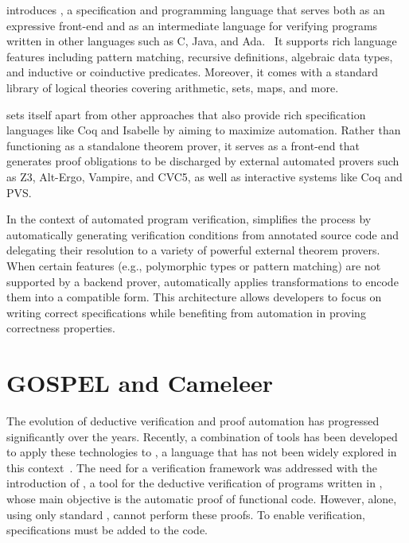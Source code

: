 \whythree introduces \whyml, a specification and programming language that serves both as an expressive front-end and as 
an intermediate language for verifying programs written in other languages such as C, Java, and Ada.~\cite{FilliatreP13} 
It supports rich language features including pattern matching, recursive definitions, algebraic data types, and inductive or 
coinductive predicates. Moreover, it comes with a standard library of logical theories covering arithmetic, sets, maps, 
and more.

\whythree sets itself apart from other approaches that also provide rich specification languages like \textsf{Coq} and 
\textsf{Isabelle} by aiming to maximize automation. Rather than functioning as a standalone theorem prover, it serves 
as a front-end that generates proof obligations to be discharged by external automated provers such as Z3, Alt-Ergo, 
Vampire, and CVC5, as well as interactive systems like Coq and PVS.

In the context of automated program verification, \whythree simplifies the process by automatically generating verification 
conditions from annotated source code and delegating their resolution to a variety of powerful external theorem provers. 
When certain features (e.g., polymorphic types or pattern matching) are not supported by a backend prover, \whythree automatically 
applies transformations to encode them into a compatible form. This architecture allows developers to focus on writing 
correct specifications while benefiting from automation in proving correctness properties.~\cite{boogie11why3}

\section{GOSPEL and Cameleer}
\label{sec:Cameleer}

The evolution of deductive verification and proof automation has progressed significantly over the years. Recently, a 
combination of tools has been developed to apply these technologies to \ocaml, a language that has not been widely explored in 
this context~\cite{PereiraR20}. The need for a verification framework was addressed with the introduction of \cameleer, a tool 
for the deductive verification of programs written in \ocaml, whose main objective is the automatic proof of functional code. 
However, \cameleer alone, using only standard \ocaml, cannot perform these proofs. To enable verification, \gospel specifications 
must be added to the \ocaml code.

